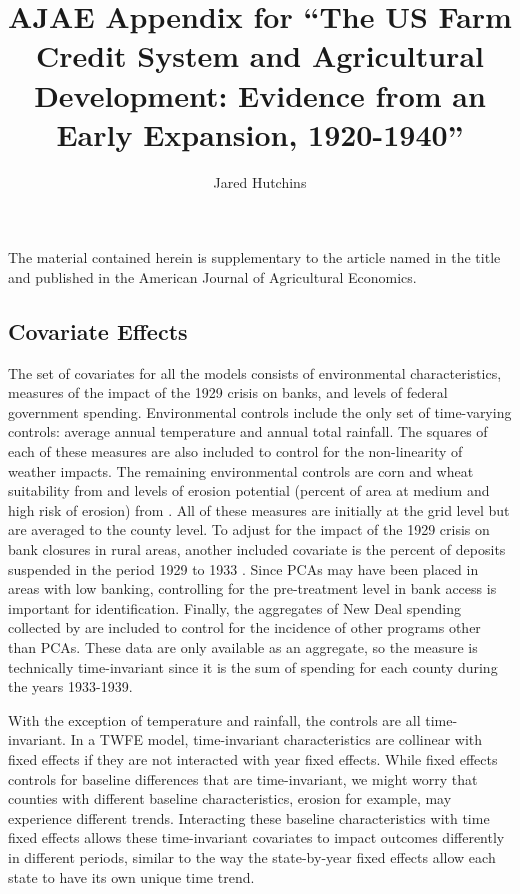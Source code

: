 \documentclass[12pt]{article}
\begin{document}
\title{AJAE Appendix for ``The US Farm Credit System and Agricultural Development: Evidence from an Early Expansion, 1920-1940''}
\author{Jared Hutchins}
\date{}
\maketitle
\begin{center}
The material contained herein is supplementary to the article named in the title and published in the American Journal of Agricultural Economics.
\end{center}
\setcounter{table}{0}
\setcounter{figure}{0}
\renewcommand{\thetable}{\Alph{section}\arabic{table}}
\renewcommand{\thefigure}{\Alph{section}\arabic{figure}}
\doublespacing
\begin{appendices}
    \section{Covariate Effects}
    \label{appendix:covars}
    \setcounter{table}{0}
    \setcounter{figure}{0}
    
    The set of covariates for all the models consists of environmental characteristics, measures of the impact of the 1929 crisis on banks, and levels of federal government spending.
    Environmental controls include the only set of time-varying controls: average annual temperature and annual total rainfall.
    The squares of each of these measures are also included to control for the non-linearity of weather impacts.
    The remaining environmental controls are corn and wheat suitability from \citet{fao} and levels of erosion potential (percent of area at medium and high risk of erosion) from \citet{hornbeck_enduring_2012}.
    All of these measures are initially at the grid level but are averaged to the county level.
    To adjust for the impact of the 1929 crisis on bank closures in rural areas, another included covariate is the percent of deposits suspended in the period 1929 to 1933 \citep{fdic_1992}.
    Since PCAs may have been placed in areas with low banking, controlling for the pre-treatment level in bank access is important for identification.
    Finally, the aggregates of New Deal spending collected by \citet{fishback_can_2003} are included to control for the incidence of other programs other than PCAs.
    These data are only available as an aggregate, so the measure is technically time-invariant since it is the sum of spending for each county during the years 1933-1939.
    
    With the exception of temperature and rainfall, the controls are all time-invariant.
    In a TWFE model, time-invariant characteristics are collinear with fixed effects if they are not interacted with year fixed effects.
    While fixed effects controls for baseline differences that are time-invariant, we might worry that counties with different baseline characteristics, erosion for example, may experience different trends.
    Interacting these baseline characteristics with time fixed effects allows these time-invariant covariates to impact outcomes differently in different periods, similar to the way the state-by-year fixed effects allow each state to have its own unique time trend.
    

\end{appendices}
\end{document}
